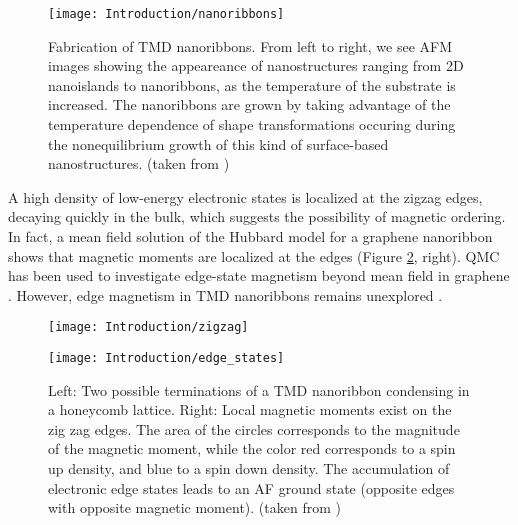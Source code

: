 \begin{figure}[H]
\centering
\texttt{[image: Introduction/nanoribbons]}
\caption[Fabrication of \ac{TMD} nanoribbons]{Fabrication of \ac{TMD} nanoribbons. From left to right, we see \ac{AFM} images showing the appeareance of nanostructures ranging from \ac{2D} nanoislands to nanoribbons, as the temperature of the substrate is increased. The nanoribbons are grown by taking advantage of the temperature dependence of shape transformations occuring during the nonequilibrium growth of this kind of surface-based nanostructures. (taken from \cite{chen_fabrication_2017})}
\label{fig:fabrication}
\end{figure}
   
A high density of low-energy electronic states is localized at the zigzag edges, decaying quickly in the bulk, which suggests the possibility of magnetic ordering.
In fact, a mean field solution of the Hubbard model for a graphene nanoribbon shows that magnetic moments are localized at the edges \cite{yazyev_emergence_2010} (Figure \ref{fig:nanoribbons}, right).
QMC has been used to investigate edge-state magnetism beyond mean field in graphene \cite{feldner_dynamical_2011, golor_quantum_2013, cheng_strain-induced_2015, raczkowski_interplay_2017, yang_strain-tuning_2017}.
However, edge magnetism in TMD nanoribbons remains unexplored \cite{davelou_nanoribbon_2017}.
 
\begin{figure}[H]
\hspace{2cm}
\begin{minipage}[c]{0.1\textwidth}
\texttt{[image: Introduction/zigzag]}
\end{minipage} \hspace{6cm}
\begin{minipage}[c]{0.1\textwidth}
\texttt{[image: Introduction/edge\_states]}
\end{minipage}
 \caption[Zigzag edges of a nanoribbon and magnetism.]{Left: Two possible terminations of a \ac{TMD} nanoribbon condensing in a honeycomb lattice. Right: Local magnetic moments exist on the zig zag edges. The area of the circles corresponds to the magnitude of the magnetic moment, while the color red corresponds to a spin up density, and blue to a spin down density. The accumulation of electronic edge states leads to an \ac{AF} ground state (opposite edges with opposite magnetic moment). (taken from \cite{yazyev_emergence_2010}) \label{fig:nanoribbons}}
\end{figure}

